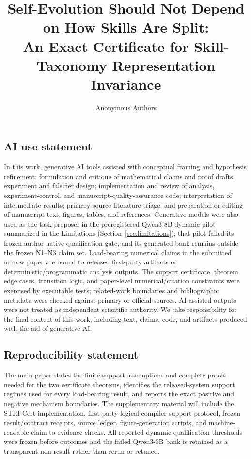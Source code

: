 \documentclass{article}
\title{Self-Evolution Should Not Depend on How Skills Are Split:\\An Exact Certificate for Skill-Taxonomy Representation Invariance}
\author{Anonymous Authors}
\begin{document}
\maketitle



\clearpage
\label{stri:post-main-page}

\subsection*{AI use statement}
In this work, generative AI tools assisted with conceptual framing and hypothesis refinement; formulation and critique of mathematical claims and proof drafts; experiment and falsifier design; implementation and review of analysis, experiment-control, and manuscript-quality-assurance code; interpretation of intermediate results; primary-source literature triage; and preparation or editing of manuscript text, figures, tables, and references. Generative models were also used as the task proposer in the preregistered Qwen3-8B dynamic pilot summarized in the Limitations (Section~\ref{sec:limitations}); that pilot failed its frozen author-native qualification gate, and its generated bank remains outside the frozen N1--N3 claim set. Load-bearing numerical claims in the submitted narrow paper are bound to released first-party artifacts or deterministic/programmatic analysis outputs. The support certificate, theorem edge cases, transition logic, and paper-level numerical/citation constraints were exercised by executable tests; related-work boundaries and bibliographic metadata were checked against primary or official sources. AI-assisted outputs were not treated as independent scientific authority. We take responsibility for the final content of this work, including text, claims, code, and artifacts produced with the aid of generative AI.

\subsection*{Reproducibility statement}
The main paper states the finite-support assumptions and complete proofs needed for the two certificate theorems, identifies the released-system support regimes used for every load-bearing result, and reports the exact positive and negative mechanism boundaries. The supplementary material will include the STRI-Cert implementation, first-party logical-compiler support protocol, frozen result/contract receipts, source ledger, figure-generation scripts, and machine-readable claim-to-evidence checks. All reported dynamic qualification thresholds were frozen before outcomes and the failed Qwen3-8B bank is retained as a transparent non-result rather than rerun or retuned.



\end{document}
